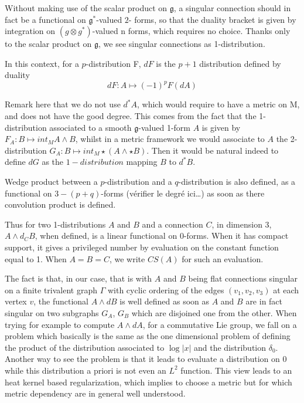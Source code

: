 \documentclass[10pt]{article}
\begin{document}
Without making use of the scalar product on $\mathfrak{g}$, a singular connection should in fact be a functional on $\mathfrak{g}^*$-valued $2$- forms, so that the duality bracket is given by integration on $(g\otimes g^*)$-valued n forms, which requires no choice. Thanks only to the scalar product on $\mathfrak{g}$, we see singular connections as 1-distribution.

In this context, for a $p$-distribution F, $d F$ is the $p+1$ distribution  defined by duality \[d F:A\mapsto (-1)^p F(d A)\]

Remark here that we do not use $d^* A$, which would require to have a metric on M, and does not have the good degree. This comes from the fact that the 1-distribution associated to a smooth $\mathfrak{g}$-valued 1-form $A$ is given by $F_A:B\mapsto int_M A\wedge B$, whilst in a metric framework we would associate to $A$ the 2-distribution $G_A:B\mapsto int_M \star (A\wedge \star B)$. Then it would be natural indeed to define $dG$ as the $1-distribution$ mapping $B$ to $d^*B$.



Wedge product between a $p$-distribution and a $q$-distribution is also defined, as a functional on $3-(p+q)$-forms   (vérifier le degré ici\dots ) as soon as there convolution product is defined.

Thus for two 1-distributions $A$ and $B$ and a connection $C$, in dimension 3, $A\wedge d_C B$, when defined, is a linear functional on $0$-forms. When it has compact support, it gives a privileged number by evaluation on the constant function equal to 1. When $A=B=C$, we write $CS(A)$ for such an evaluation.

The fact is that, in our case, that is with $A$ and $B$ being flat connections singular on a finite trivalent graph $\Gamma$ with cyclic ordering of the edges $(v_1,v_2,v_3)$ at each vertex $v$, the functional  $A\wedge dB$ is well defined as soon as $A$ and $B$ are in fact singular on two subgraphs $G_A$, $G_B$ which are disjoined one from the other. When trying for example to compute $A\wedge dA$, for a commutative Lie group, we fall on a problem which basically is the same as the one dimensional problem of defining the product of the distribution associated to $\log |x|$ and the distribution $\delta_0$. Another way to see the problem is that it leads to evaluate a distribution on 0 while this distribution a priori is not even an $L^2$ function. This view leads to an heat kernel based regularization, which implies to choose a metric but for which metric dependency are in general well understood.
\end{document}
